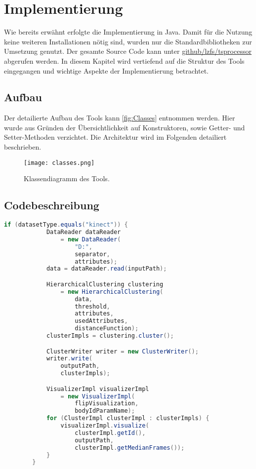 \chapter{Implementierung}
\label{chapter5}

Wie bereits erwähnt erfolgte die Implementierung in Java.
Damit für die Nutzung keine weiteren Installationen nötig sind,
wurden nur die Standardbibliotheken zur Umsetzung genutzt.
Der gesamte Source Code kann unter \href{https://github.com/lzfs/tsprocessor}{github/lzfs/tsprocessor}
abgerufen werden.
In diesem Kapitel wird vertiefend auf die Struktur des Tools eingegangen
und wichtige Aspekte der Implementierung betrachtet.


\section{Aufbau}
\label{5-Aufbau}
Der detailierte Aufbau des Tools kann \autoref{fig:Classes} entnommen werden.
Hier wurde aus Gründen der Übersichtlichkeit auf Konstruktoren,
sowie Getter- und Setter-Methoden verzichtet.
Die Architektur wird im Folgenden detailiert beschrieben.

\begin{figure}[ht]
    \begin{center}
        \texttt{[image: classes.png]}
    \end{center}
    \caption{Klassendiagramm des Tools.}
    \label{fig:Classes}
\end{figure}



\section{Codebeschreibung}
\label{5-Codebeschreibung}

\begin{lstlisting}[language=Java, caption=Processor-Workflow.]
    if (datasetType.equals("kinect")) {
            DataReader dataReader
                = new DataReader(
                    "D:",
                    separator,
                    attributes);
            data = dataReader.read(inputPath);

            HierarchicalClustering clustering
                = new HierarchicalClustering(
                    data,
                    threshold,
                    attributes,
                    usedAttributes,
                    distanceFunction);
            clusterImpls = clustering.cluster();

            ClusterWriter writer = new ClusterWriter();
            writer.write(
                outputPath,
                clusterImpls);

            VisualizerImpl visualizerImpl
                = new VisualizerImpl(
                    flipVisualization,
                    bodyIdParamName);
            for (ClusterImpl clusterImpl : clusterImpls) {
                visualizerImpl.visualize(
                    clusterImpl.getId(),
                    outputPath,
                    clusterImpl.getMedianFrames());
            }
        }
\end{lstlisting}



